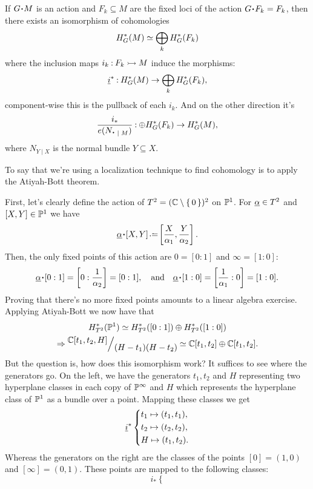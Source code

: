 \documentclass[12pt]{memoir}
\begin{document}
\begin{Th}
    If $G\.M$ is an action and $F_k\subseteq M$ are the fixed loci of the action $G\.F_k=F_k$, then there exists an isomorphism of cohomologies
    $$H^\ast_G(M)\simeq \bigoplus_kH^\ast_G(F_k)$$
    where the inclusion maps $i_k\mathbin{:} F_k\rightarrowtail M$ induce the morphisms:
    $$\underline{i}^\ast\mathbin{:}H^\ast_G(M)\to\bigoplus_kH^\ast_G(F_k),$$
    component-wise this is the pullback of each $i_k$. And on the other direction it's
 $$\frac{i_\ast}{e(N_{\.\mid M})}\:\oplus H^\ast_G(F_k)\to H^\ast_G(M),$$ 
 where $N_{Y\mid X}$ is the normal bundle $Y\subseteq X$.
\end{Th}

To say that we're using a localization technique to find cohomology is to apply the Atiyah-Bott theorem.

\begin{Ex}\label{ex-projective-line-cohom-local}
First, let's clearly define the action of $T^2=(\mathbb{C}\setminus\{\,0\,\})^2$ on $\mathbb{P}^1$. For $\underline{\alpha}\in T^2$ and $[X,Y]\in\mathbb{P}^1$ we have
$$\un{\al}\.[X,Y]\defeq \bonj{\frac{X}{\al_1},\frac{Y}{\al_2}}.$$
Then, the only fixed points of this action are $0=[0:1]$ and $\infty=[1:0]$:
$$\un{\al}\.[0:1]=\bonj{0:\frac{1}{\al_2}}=[0:1],\word{and}\un{\al}\.[1:0]=\bonj{\frac{1}{\al_1}:0}=[1:0].$$
Proving that there's no more fixed points amounts to a linear algebra exercise. Applying Atiyah-Bott we now have that 
\begin{gather*}
    H_{T^2}^\ast(\bP^1)\isom H_{T^2}^\ast([0:1])\oplus H_{T^2}^\ast([1:0])\\
    \To\quot{\bC[t_1,t_2,H]}{(H-t_1)(H-t_2)}\isom \bC[t_1,t_2]\oplus\bC[t_1,t_2].
\end{gather*} But the question is, how does this isomorphism work? It suffices to see where the generators go. On the left, we have the generators $t_1, t_2$ and $H$ representing two hyperplane classes in each copy of $\mathbb{P}^\infty$ and $H$ which represents the hyperplane class of $\mathbb{P}^1$ as a bundle over a point. Mapping these classes we get
$$\underline i^\ast\left\lbrace
\begin{aligned}
    &t_1\mapsto (t_1,t_1),\\
    &t_2\mapsto (t_2,t_2),\\
    &H\mapsto (t_1,t_2).
\end{aligned}
\right.$$
Whereas the generators on the right are the classes of the points $[0]=(1,0)$ and $[\infty]=(0,1)$. These points are mapped to the following classes:
$$i_\ast\left\lbrace
$$
\end{Ex}
\end{document}
